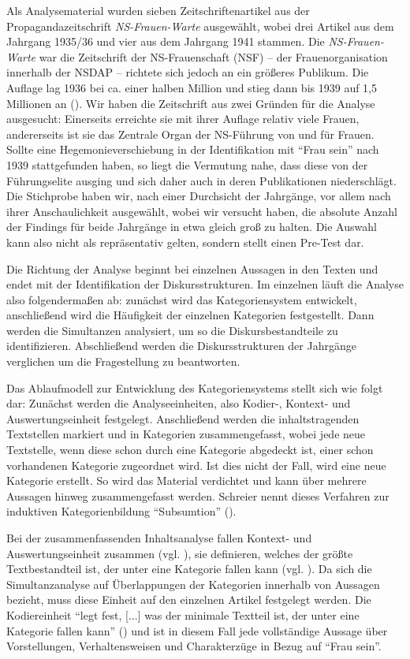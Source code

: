\documentclass[12pt, titlepage=true, toc=bib]{scrartcl}
\begin{document}
Als Analysematerial wurden sieben Zeitschriftenartikel aus der Propagandazeitschrift \textit{NS-Frauen-Warte} ausgewählt, wobei drei Artikel aus dem Jahrgang 1935/36 und vier aus dem Jahrgang 1941 stammen. Die \textit{NS-Frauen-Warte} war die Zeitschrift der NS-Frauenschaft (NSF) -- der Frauenorganisation innerhalb der NSDAP -- richtete sich jedoch an ein größeres Publikum. Die Auflage lag 1936 bei ca. einer halben Million und stieg dann bis 1939 auf 1,5 Millionen an (\cite[vgl.][89-90]{dohring_von_2004}). Wir haben die Zeitschrift aus zwei Gründen für die Analyse ausgesucht: Einerseits erreichte sie mit ihrer Auflage relativ viele Frauen, andererseits ist sie das Zentrale Organ der NS-Führung von und für Frauen. Sollte eine Hegemonieverschiebung in der Identifikation mit "`Frau sein"' nach 1939 stattgefunden haben, so liegt die Vermutung nahe, dass diese von der Führungselite ausging und sich daher auch in deren Publikationen niederschlägt. Die Stichprobe haben wir, nach einer Durchsicht der Jahrgänge, vor allem nach ihrer Anschaulichkeit ausgewählt, wobei wir versucht haben, die absolute Anzahl der Findings für beide Jahrgänge in etwa gleich groß zu halten. Die Auswahl kann also nicht als repräsentativ gelten, sondern stellt einen Pre-Test dar.

Die Richtung der Analyse beginnt bei einzelnen Aussagen in den Texten und endet mit der Identifikation der Diskursstrukturen. Im einzelnen läuft die Analyse also folgendermaßen ab: zunächst wird das Kategoriensystem entwickelt, anschließend wird die Häufigkeit der einzelnen Kategorien festgestellt. Dann werden die Simultanzen analysiert, um so die Diskursbestandteile zu identifizieren. Abschließend werden die Diskursstrukturen der Jahrgänge verglichen um die Fragestellung zu beantworten.

Das Ablaufmodell zur Entwicklung des Kategoriensystems stellt sich wie folgt dar: Zunächst werden die Analyseeinheiten, also Kodier-, Kontext- und Auswertungseinheit festgelegt. Anschließend werden die inhaltstragenden Textstellen markiert und in Kategorien zusammengefasst, wobei jede neue Textstelle, wenn diese schon durch eine Kategorie abgedeckt ist, einer schon vorhandenen Kategorie zugeordnet wird. Ist dies nicht der Fall, wird eine neue Kategorie erstellt. So wird das Material verdichtet und kann über mehrere Aussagen hinweg zusammengefasst werden. Schreier nennt dieses Verfahren zur induktiven Kategorienbildung "`Subsumtion"' (\cite[7]{schreier_varianten_2014}).

Bei der zusammenfassenden Inhaltsanalyse fallen Kontext- und Auswertungseinheit zusammen (vgl. \cite[71]{mayring_qualitative_2010}), sie definieren, welches der größte Textbestandteil ist, der unter eine Kategorie fallen kann (vgl. \cite[59]{mayring_qualitative_2010}). Da sich die Simultanzanalyse auf Überlappungen der Kategorien innerhalb von Aussagen bezieht, muss diese Einheit auf den einzelnen Artikel festgelegt werden. Die Kodiereinheit "`legt fest, [...] was der minimale Textteil ist, der unter eine Kategorie fallen kann"' (\cite[59]{mayring_qualitative_2010}) und ist in diesem Fall jede vollständige Aussage über Vorstellungen, Verhaltensweisen und Charakterzüge in Bezug auf "`Frau sein"'.
\end{document}
